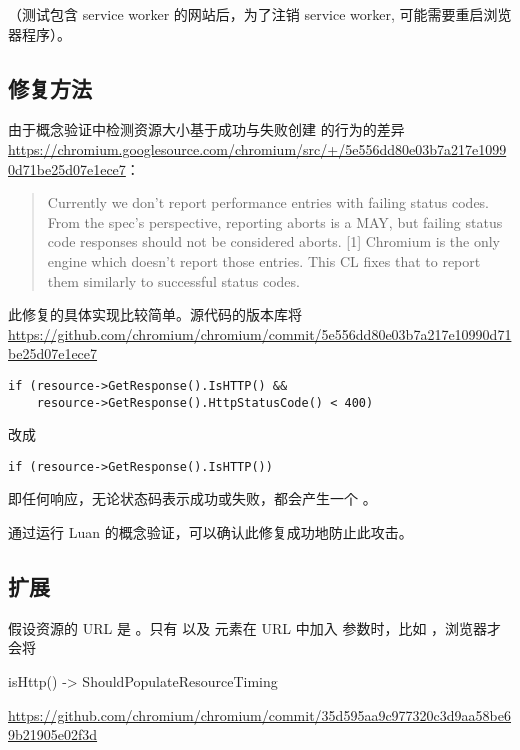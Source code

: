 （测试包含 service worker 的网站后，为了注销 service worker, 可能需要重启浏览器程序）。

\subsection{修复方法}

由于概念验证中检测资源大小基于成功与失败创建  的行为的差异 \url{https://chromium.googlesource.com/chromium/src/+/5e556dd80e03b7a217e10990d71be25d07e1ece7}：

\begin{quote}
    Currently we don't report performance entries with failing status codes.
    From the spec's perspective, reporting aborts is a MAY, but failing
    status code responses should not be considered aborts. [1]
    Chromium is the only engine which doesn't report those entries.
    This CL fixes that to report them similarly to successful status codes.
\end{quote}

此修复的具体实现比较简单。源代码的版本库将 \url{https://github.com/chromium/chromium/commit/5e556dd80e03b7a217e10990d71be25d07e1ece7}

\begin{lstlisting}
if (resource->GetResponse().IsHTTP() &&
    resource->GetResponse().HttpStatusCode() < 400)
\end{lstlisting}

改成 

\begin{lstlisting}
if (resource->GetResponse().IsHTTP())
\end{lstlisting}

即任何响应，无论状态码表示成功或失败，都会产生一个 。

通过运行 Luan 的概念验证，可以确认此修复成功地防止此攻击。

\subsection{扩展}

假设资源的 URL 是 。只有  以及  元素在 URL 中加入  参数时，比如 ，浏览器才会将

isHttp() -> ShouldPopulateResourceTiming

\url{https://github.com/chromium/chromium/commit/35d595aa9c977320c3d9aa58be69b21905e02f3d}

